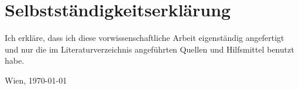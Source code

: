 \documentclass[DLS,
	inreferencehack,
	ohneVgl=false,
	ohneS=false,
	scauthor,
	rundeauslassung=false,
	bookstyle=false,
	widowlines=3,
	titlepage=DLS2017,
	listof=nochaptergap,
	doppelpunkt=false,
	postnotedoppelpunkt=false,
	zitierstil=klassisch]{vwa}
\begin{document}
\frontmatter

\maketitle



%

\cleardoublepage{}
\tableofcontents

\mainmatter





%



\listoffigures

\appendix
% 
%

\backmatter

\section*{Selbstständigkeitserklärung}
\thispagestyle{plain}
Ich erkläre, dass ich diese vorwissenschaftliche Arbeit eigenständig
angefertigt und nur die im Literaturverzeichnis angeführten Quellen und
Hilfsmittel benutzt habe.

\vspace{2cm}\noindent Wien, \today

\vspace{2cm}\noindent\makeatletter\@AutorIn\makeatother
\end{document}
